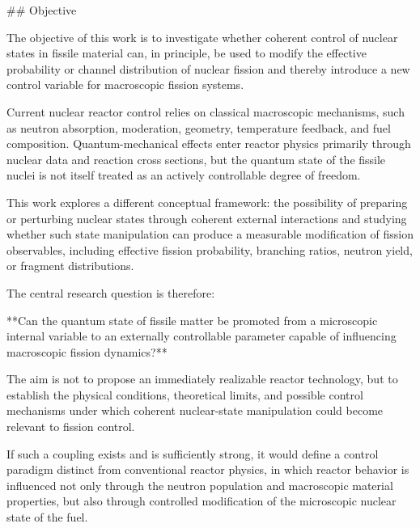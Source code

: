 ## Objective

The objective of this work is to investigate whether coherent control of nuclear states in fissile material can, in principle, be used to modify the effective probability or channel distribution of nuclear fission and thereby introduce a new control variable for macroscopic fission systems.

Current nuclear reactor control relies on classical macroscopic mechanisms, such as neutron absorption, moderation, geometry, temperature feedback, and fuel composition. Quantum-mechanical effects enter reactor physics primarily through nuclear data and reaction cross sections, but the quantum state of the fissile nuclei is not itself treated as an actively controllable degree of freedom.

This work explores a different conceptual framework: the possibility of preparing or perturbing nuclear states through coherent external interactions and studying whether such state manipulation can produce a measurable modification of fission observables, including effective fission probability, branching ratios, neutron yield, or fragment distributions.

The central research question is therefore:

**Can the quantum state of fissile matter be promoted from a microscopic internal variable to an externally controllable parameter capable of influencing macroscopic fission dynamics?**

The aim is not to propose an immediately realizable reactor technology, but to establish the physical conditions, theoretical limits, and possible control mechanisms under which coherent nuclear-state manipulation could become relevant to fission control.

If such a coupling exists and is sufficiently strong, it would define a control paradigm distinct from conventional reactor physics, in which reactor behavior is influenced not only through the neutron population and macroscopic material properties, but also through controlled modification of the microscopic nuclear state of the fuel.
